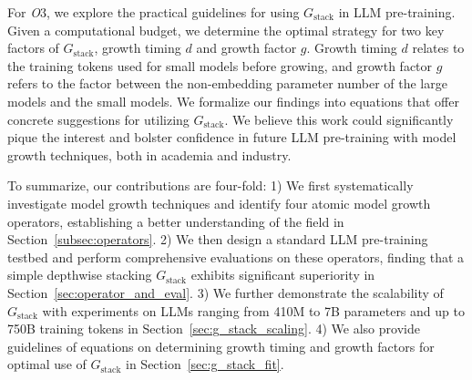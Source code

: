 \documentclass{article}
\begin{document}
For \textit{O}3, we explore the practical guidelines for using $G_{\text{stack}}$ in LLM pre-training.
Given a computational budget, we determine the optimal strategy for two key factors of $G_{\text{stack}}$, growth timing $d$ and growth factor $g$. Growth timing $d$ relates to the training tokens used for small models before growing, and growth factor $g$ refers to the factor between the non-embedding parameter number of the large models and the small models.
We formalize our findings into equations that offer concrete suggestions for utilizing $G_{\text{stack}}$. We believe this work could significantly pique the interest and bolster confidence in future LLM pre-training with model growth techniques,
both in academia and industry.

To summarize, our contributions are four-fold:
1) We first systematically investigate model growth techniques and identify four atomic model growth operators, establishing a better understanding of the field in Section~\ref{subsec:operators}. 
2) We then design a standard LLM pre-training testbed and perform comprehensive evaluations on these operators, finding that a simple depthwise stacking $G_{\text{stack}}$ exhibits significant superiority in Section~\ref{sec:operator_and_eval}. 
3) We further demonstrate the scalability of  $G_{\text{stack}}$ with experiments on LLMs ranging from 410M to 7B parameters and up to 750B training tokens in Section~\ref{sec:g_stack_scaling}. 
4) We also provide guidelines of equations on determining growth timing and growth factors for optimal use of $G_{\text{stack}}$ in Section~\ref{sec:g_stack_fit}.
\end{document}
